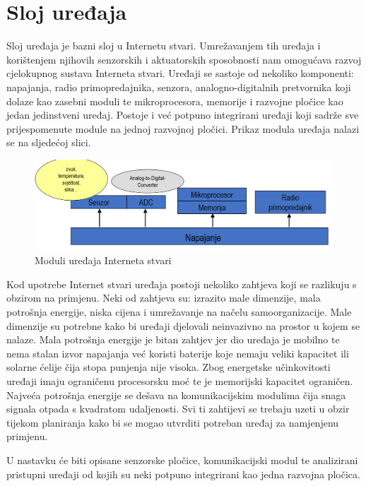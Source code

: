 \documentclass[times, utf8, diplomski]{fer}
\begin{document}
\section{Sloj uređaja}
Sloj uređaja je bazni sloj u Internetu stvari. Umrežavanjem tih uređaja i korištenjem njihovih senzorskih i aktuatorskih sposobnosti nam omogućava razvoj cjelokupnog sustava Interneta stvari. Uređaji se sastoje od nekoliko komponenti: napajanja, radio primopredajnika, senzora, analogno-digitalnih pretvornika koji dolaze kao zasebni moduli te mikroprocesora, memorije i razvojne pločice kao jedan jedinstveni uređaj. Postoje i već potpuno integrirani uređaji koji sadrže sve prijespomenute module na jednoj razvojnoj pločici. Prikaz modula uređaja nalazi se na sljedećoj slici.
\begin{figure}[htb]
    \centering
    \includegraphics[width=14cm]{images/devicemodule.png}
    \caption{Moduli uređaja Interneta stvari\citep{InternetStvari}}
    \label{fig:devicemodule}
\end{figure}

Kod upotrebe Internet stvari uređaja postoji nekoliko zahtjeva koji se razlikuju s obzirom na primjenu. Neki od zahtjeva su: izrazito male dimenzije, mala potrošnja energije, niska cijena i umrežavanje na načelu samoorganizacije. Male dimenzije su potrebne kako bi uređaji djelovali neinvazivno na prostor u kojem se nalaze. Mala potrošnja energije je bitan zahtjev jer dio uređaja je mobilno te nema stalan izvor napajanja već koristi baterije koje nemaju veliki kapacitet ili solarne ćelije čija stopa punjenja nije visoka. Zbog energetske učinkovitosti uređaji imaju ograničenu procesorsku moć te je memorijski kapacitet ograničen. Najveća potrošnja energije se dešava na komunikacijskim modulima čija snaga signala otpada s kvadratom udaljenosti. Svi ti zahtijevi se trebaju uzeti u obzir tijekom planiranja kako bi se mogao utvrditi potreban uređaj za namjenjenu primjenu.

U nastavku će biti opisane senzorske pločice, komunikacijski modul te analizirani pristupni uređaji od kojih su neki potpuno integrirani kao jedna razvojna pločica.
\end{document}
